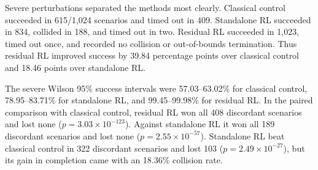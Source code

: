 \documentclass[10pt,twocolumn]{article}
\begin{document}
\begin{table}[t]
\centering
\caption{Isaac Lab results. Time, path, efficiency, variation, and clearance are means over successful episodes; RA efficiency is reliability-adjusted efficiency. Each row contains 1,024 episodes.}
\label{tab:isaac}
\end{table}

Severe perturbations separated the methods most clearly. Classical control succeeded in 615/1,024 scenarios and timed out in 409. Standalone RL succeeded in 834, collided in 188, and timed out in two. Residual RL succeeded in 1,023, timed out once, and recorded no collision or out-of-bounds termination. Thus residual RL improved success by 39.84 percentage points over classical control and 18.46 points over standalone RL.

The severe Wilson 95\% success intervals were 57.03--63.02\% for classical control, 78.95--83.71\% for standalone RL, and 99.45--99.98\% for residual RL. In the paired comparison with classical control, residual RL won all 408 discordant scenarios and lost none ($p=3.03\times10^{-123}$). Against standalone RL it won all 189 discordant scenarios and lost none ($p=2.55\times10^{-57}$). Standalone RL beat classical control in 322 discordant scenarios and lost 103 ($p=2.49\times10^{-27}$), but its gain in completion came with an 18.36\% collision rate.
\end{document}
